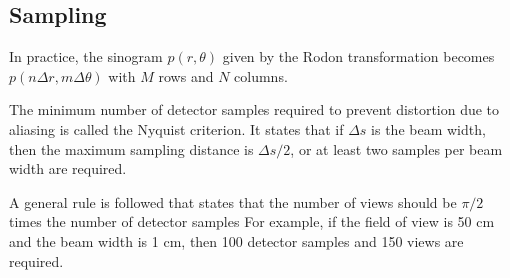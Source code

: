 \documentclass[../../../main.tex]{subfiles}
\begin{document}
\subsection{Sampling}
In practice, the sinogram $p(r,\theta)$ given by the Rodon transformation becomes $p(n\Delta  r,m\Delta\theta)$ with $M$ rows and $N$ columns.

The minimum number of detector samples required to prevent distortion due to aliasing is called the Nyquist criterion.
It states that if $\Delta s$ is the beam width, then the maximum sampling distance is $\Delta s/2$, or at least two samples per beam width are required.

A general rule is followed that states that the number of views should be $\pi/2$ times the number of detector samples
For example, if the field of view is 50 cm and the beam width is 1 cm, then 100 detector samples and 150 views are required.
\end{document}
